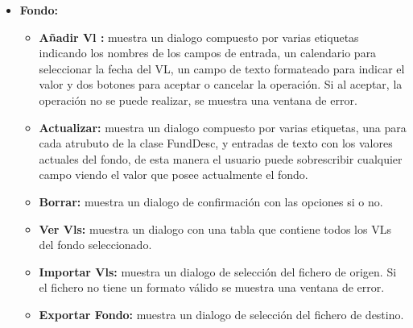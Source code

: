 \documentclass[12pt, a4paper]{article}
\begin{document}
\begin{itemize}
	\item \textbf{Fondo:}
	\begin{itemize}
		\item \textbf{Añadir Vl :} muestra un dialogo compuesto por varias etiquetas indicando los nombres de  los campos de entrada, un calendario para seleccionar la fecha del \gls{VL}, un campo de texto formateado para indicar el valor y dos botones para aceptar o cancelar la operación. Si al aceptar, la operación no se puede realizar, se muestra una ventana de error.
		\item \textbf{Actualizar:} muestra un dialogo compuesto por varias etiquetas, una para cada atrubuto de la clase FundDesc, y entradas de texto con los valores actuales del fondo, de esta manera el usuario puede sobrescribir cualquier campo viendo el valor que posee actualmente el fondo. 
		\item \textbf{Borrar:} muestra un dialogo de confirmación con las opciones si o no.
		\item \textbf{Ver Vls:} muestra un dialogo con una tabla que contiene todos los \gls{VL}s del fondo seleccionado.
		\item \textbf{Importar Vls:} muestra un dialogo de selección del fichero de origen. Si el fichero no tiene un formato válido se muestra una ventana de error.
		\item \textbf{Exportar Fondo:} muestra un dialogo de selección del fichero de destino.
	\end{itemize}
\end{itemize}
\newpage
\end{document}
